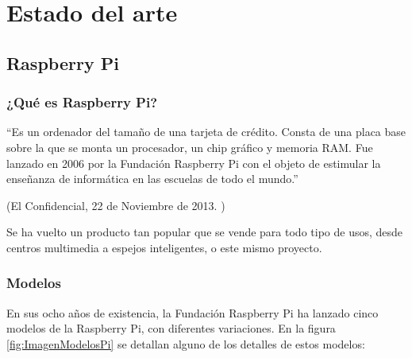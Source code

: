 
\chapter{Estado del arte} %
\label{sec:EstadoDelArte}

    \section{Raspberry Pi} %
    \label{sec:RaspberryPi}

        \subsection{¿Qué es Raspberry Pi?} %
        \label{sub:QueEsRaspberryPi}

            ``Es un ordenador del tamaño de una tarjeta de crédito. Consta de una placa base sobre la que se monta un
            procesador, un chip gráfico y memoria RAM. Fue lanzado en 2006 por la Fundación Raspberry Pi con el objeto
            de estimular la enseñanza de informática en las escuelas de todo el mundo.''

            \begin{flushright}
                (El Confidencial, 22 de Noviembre de 2013. \cite{confidencial_raspberry})
            \end{flushright}

            Se ha vuelto un producto tan popular que se vende para todo tipo de usos, desde centros
            multimedia\cite{centro_multimedia_raspberry_pi} a espejos inteligentes\cite{espejo_raspberry_pi}, o este
            mismo proyecto.


        \subsection{Modelos} %
        \label{sub:ModelosRaspberryPi}

            En sus ocho años de existencia, la Fundación Raspberry Pi ha lanzado cinco modelos de la Raspberry Pi, con
            diferentes variaciones. En la figura \ref{fig:ImagenModelosPi} se detallan alguno de los detalles de estos
            modelos\cite{raspberry_pi_wikipedia_en}:

